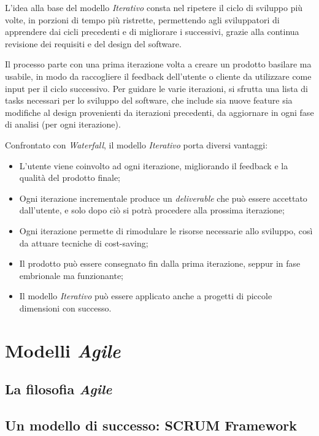 \documentclass[a4paper,12pt]{report}
\begin{document}
				\vspace{5mm}
				L'idea alla base del modello \emph{Iterativo} consta nel ripetere il ciclo di sviluppo più volte, in porzioni di tempo più ristrette,
				permettendo agli sviluppatori di apprendere dai cicli precedenti e di migliorare i successivi, grazie alla continua
				revisione dei requisiti e del design del software.
				
				\vspace{5mm}
				Il processo parte con una prima iterazione volta a creare un prodotto basilare ma usabile, in modo da raccogliere il feedback
				dell'utente o cliente da utilizzare come input per il ciclo successivo. Per guidare le varie iterazioni, si sfrutta una lista
				di tasks necessari per lo sviluppo del software, che include sia nuove feature sia modifiche al design provenienti da iterazioni
				precedenti, da aggiornare in ogni fase di analisi (per ogni iterazione).
				
				Confrontato con \emph{Waterfall}, il modello \emph{Iterativo} porta diversi vantaggi:
				\begin{itemize}
					\item L'utente viene coinvolto ad ogni iterazione, migliorando il feedback e la qualità del prodotto finale;
					\item Ogni iterazione incrementale produce un \emph{deliverable} che può essere accettato dall'utente, e solo dopo ciò si potrà procedere alla prossima iterazione;
					\item Ogni iterazione permette di rimodulare le risorse necessarie allo sviluppo, così da attuare tecniche di cost-saving;
					\item Il prodotto può essere consegnato fin dalla prima iterazione, seppur in fase embrionale ma funzionante;
					\item Il modello \emph{Iterativo} può essere applicato anche a progetti di piccole dimensioni con successo.
				\end{itemize}
	
		\section{Modelli \emph{Agile}}
	
			\subsection{La filosofia \emph{Agile}}
	
			\subsection{Un modello di successo: SCRUM Framework}
			
\end{document}
